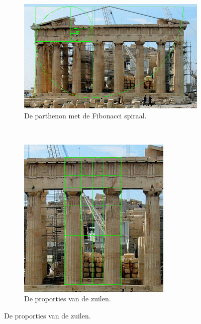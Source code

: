 \documentclass{article}
\begin{document}
\begin{figure}[Hh]
    \centering
    \begin{subfigure}[b]{0.55\textwidth}
        \includegraphics[width=\textwidth]{parthenon.png}
		\caption{De parthenon met de Fibonacci spiraal.}
		\label{fig:parthenon}
    \end{subfigure}
    ~ 
    \begin{subfigure}[b]{0.3\textwidth}
        \includegraphics[width=\textwidth]{parthenon-columns.png}
		\caption{De proporties van de zuilen.}
		\label{fig:parthenon-columns}

\end{subfigure}
\end{figure}
\end{document}
